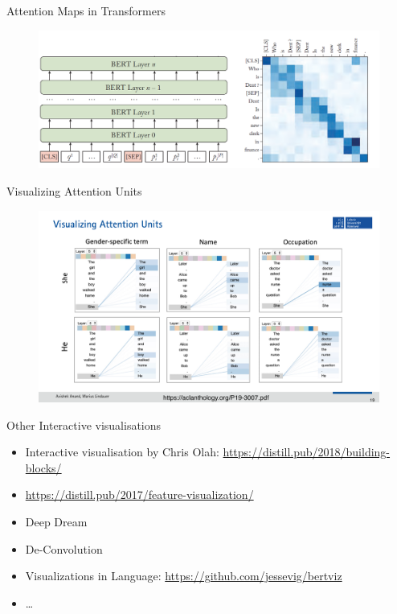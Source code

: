 \documentclass[11pt,compress,t,notes=noshow, aspectratio=169, xcolor=table]{beamer}
\begin{document}
\begin{frame}{Attention Maps in Transformers}
\begin{figure}
    \centering
    \includegraphics[scale=.4]{bild13}
\end{figure}
    
\end{frame}

\begin{frame}{Visualizing Attention Units}
    \begin{figure}
        \includegraphics[scale=.45]{slides/gradient-based/figure/iml-attention-vis.pdf}
    \end{figure}
\end{frame}

\begin{frame}{Other Interactive visualisations}
    \begin{itemize}
        \item Interactive visualisation by Chris Olah: \url{https://distill.pub/2018/building-blocks/}
        \item \url{https://distill.pub/2017/feature-visualization/}
        \item Deep Dream
        \item De-Convolution
        \item Visualizations in Language: \url{https://github.com/jessevig/bertviz}
        \item \dots
    \end{itemize}
\end{frame}

\endlecture
\end{document}
